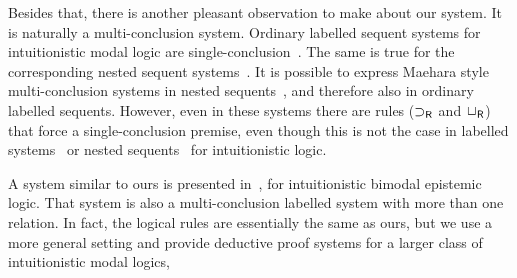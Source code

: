 Besides that, there is another pleasant observation to make about our
system. It is naturally a multi-conclusion system. Ordinary labelled sequent systems for intuitionistic modal
logic are single-conclusion~\cite{simpson:phd}. 
%
The same is true for the corresponding nested sequent
systems~\cite{str:fossacs13,marin:str:aiml}. It is possible to express
Maehara style multi-conclusion systems in nested
sequents~\cite{str:2017maehara}, and therefore also in ordinary
labelled sequents. However, even in these systems there are rules
($\mathsf{\mathbin{\supset}}_{\mathsf{R}}$ and $\mathsf{\mathord{\Box}}_{\mathsf{R}}$) that force a single-conclusion
premise, even though this is not the case in labelled
systems~\cite{negri:jpl2005} or nested sequents~\cite{fitting:2014} for
intuitionistic logic. 

A system similar to ours is presented
in~\cite{maffezioli:etal:synthese13}, for intuitionistic bimodal
epistemic logic. That system is also a multi-conclusion labelled system with
more than one relation. In fact, the logical rules are essentially the
same as ours, but we use a more general setting and provide deductive proof
systems for a larger class of intuitionistic modal logics, 




